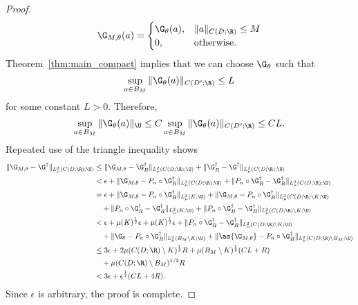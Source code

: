 \begin{proof}
\begin{equation*}
    \G_{M,\theta}(a) = \begin{cases}
    \G_\theta(a), & \|a\|_{C(D;\R)} \leq M \\
    0, & \text{otherwise.}
    \end{cases}
\end{equation*}
Theorem~\ref{thm:main_compact} implies that we can choose \(\G_\theta\) such that
\[\sup_{a \in B_M} \|\G_\theta (a) \|_{C(D';\R)} \leq L\]
for some constant \(L > 0\). Therefore,
\[\sup_{a \in B_M} \|\G_\theta (a) \|_{\U} \leq C \sup_{a \in B_M} \| \G_\theta (a) \|_{C(D';\R)} \leq CL.\]
Repeated use of the triangle inequality shows
\begin{align*}
    \|\G_{M,\theta} - \G^\dagger\|_{L^2_\mu(C(D;\R);\U)} &\leq \|\G_{M,\theta} - \G^\dagger_R\|_{L^2_\mu(C(D;\R);\U)} + \|\G^\dagger_R - \G^\dagger\|_{L^2_\mu(C(D;\R);\U)} \\
    &<  \epsilon + \|\G_{M,\theta} - P_n \circ \G^\dagger_R \|_{L^2_\mu(C(D;\R);\U)} + \|P_n \circ \G^\dagger_R - \G^\dagger_R\|_{L^2_\mu(C(D;\R);\U)} \\
    &= \epsilon + \|\G_{M,\theta} - P_n \circ \G^\dagger_R \|_{L^2_\mu(K;\U)} + \|\G_{M,\theta} - P_n \circ \G^\dagger_R \|_{L^2_\mu(C(D;\R) \setminus K;\U)} \\
    &\quad+  \|P_n \circ \G^\dagger_R - \G^\dagger_R\|_{L^2_\mu(K;\U)} + \|P_n \circ \G^\dagger_R - \G^\dagger_R\|_{L^2_\mu(C(D;\R) \setminus K;\U)} \\
    &< \epsilon + \mu(K)^{\frac{1}{2}} \epsilon  + \mu(K)^{\frac{1}{2}} \epsilon + \|P_n \circ \G^\dagger_R - \G^\dagger_R\|_{L^2_\mu(C(D;\R) \setminus K;\U)} \\
    &\quad+ \|\G_\theta - P_n \circ \G_R^\dagger \|_{L^2_\mu(B_M \setminus K;\U)} + \|\as{\G_{M,\theta}} - P_n \circ \G_R^\dagger \|_{L^2_\mu(C(D;\R) \setminus B_M;\U)} \\
    &\leq 3 \epsilon  + 2 \mu(C(D;\R) \setminus K)^{\frac{1}{2}} R + \mu(B_M \setminus K)^{\frac{1}{2}} (CL + R) \\
    &\quad+ \mu(C(D;\R) \setminus B_M)^{1/2} R \\
    &< 3\epsilon + \epsilon^{\frac{1}{2}}(CL + 4R).
\end{align*}
Since \(\epsilon\) is arbitrary, the proof is complete.
\end{proof}

